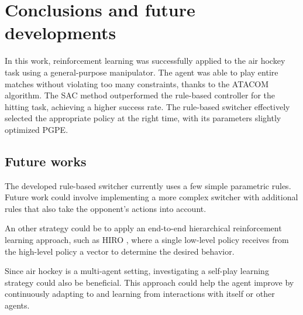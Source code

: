 \chapter{Conclusions and future developments}
\label{ch:conclusions}%
In this work, reinforcement learning was successfully applied to the air hockey task using a general-purpose manipulator. 
The agent was able to play entire matches without violating too many constraints, thanks to the ATACOM algorithm. 
The SAC method outperformed the rule-based controller for the hitting task, achieving a higher success rate. 
The rule-based switcher effectively selected the appropriate policy at the right time, with its parameters slightly optimized PGPE.

\section{Future works}
The developed rule-based switcher currently uses a few simple parametric rules. 
Future work could involve implementing a more complex switcher with additional rules that also take the opponent's actions into account.

An other strategy could be to apply an end-to-end hierarchical reinforcement learning approach, such as HIRO \cite{HIRO}, where a single low-level policy receives from the high-level
policy a vector to determine the desired behavior.

Since air hockey is a multi-agent setting, investigating a self-play learning strategy could also be beneficial. 
This approach could help the agent improve by continuously adapting to and learning from interactions with itself or other agents.

